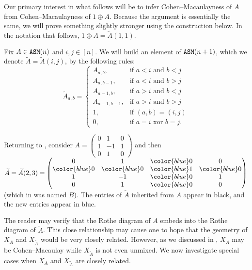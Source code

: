 \documentclass[12 pt]{amsart}
\DeclareMathOperator{\asm}{\tt ASM}
\theoremstyle{plain}
\newenvironment{example}
  {\pushQED{\qed}\renewcommand{\qedsymbol}{$\diamondsuit$}\examplex}
  {\popQED\endexamplex}
\theoremstyle{definition}
\theoremstyle{remark}
\begin{document}
{Our primary interest in what follows will be to infer Cohen--Macaulayness of $A$ from Cohen--Macaulayness of $1 \oplus A$.  Because the argument is essentially the same, we will prove something slightly stronger using the construction below.  In the notation that follows, $1 \oplus A = \widetilde{A}(1,1)$.

Fix $A \in \asm(n)$ and $i, j \in [n]$. We will build an element of $\asm(n+1)$, which we denote $\widetilde{A} = \widetilde{A}(i,j)$, by the following rules: 
\[
\widetilde{A}_{a,b}=\begin{cases}
			A_{a,b}, & \text{if $a<i$ and $b<j$}\\
            A_{a,b-1}, & \text{if $a<i$ and $b>j$}\\
            A_{a-1,b}, & \text{if $a>i$ and $b<j$}\\
            A_{a-1,b-1}, & \text{if $a>i$ and $b>j$}\\
            1, & \text{if $(a,b)=(i,j)$}\\
            0, & \text{if $a=i$ xor $b=j$}.
		 \end{cases}
\]

\begin{example}\label{ex:widetilde{A}}
    Returning to , consider $A = \begin{pmatrix}
        0 & 1 & 0\\
        1 & -1 & 1\\
        0 & 1 & 0
    \end{pmatrix}$ and then $\widetilde{A}  = \widetilde{A}(2,3)= \begin{pmatrix}
        0 & 1 & {\color{blue}0} & 0\\
        {\color{blue}0} & {\color{blue}0} & {\color{blue}1} & {\color{blue}0}\\
         1 & -1 & {\color{blue}0} & 1\\
        0 & 1 & {\color{blue}0} & 0
    \end{pmatrix}$ (which in  was named $B$).  The entries of $\widetilde{A}$ inherited from $A$ appear in black, and the new entries appear in blue.  
\end{example}

The reader may verify that the Rothe diagram of $A$ embeds into the Rothe diagram of $\widetilde{A}$.  This close relationship may cause one to hope that the geometry of $X_A$ and $X_{\widetilde{A}}$ would be very closely related.  However, as we discussed in , $X_A$ may be Cohen--Macaulay while $X_{\widetilde{A}}$ is not even unmixed. We now investigate special cases when $X_A$ and $X_{\widetilde{A}}$ are closely related.

}
\end{document}
